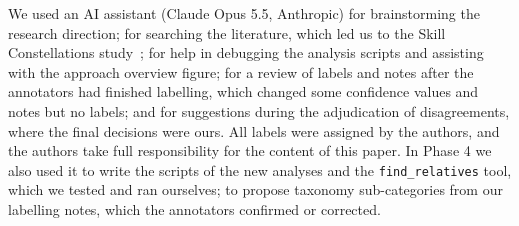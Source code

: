 \documentclass[sigconf,screen]{acmart}
\begin{document}
\begin{acks}
We used an AI assistant (Claude Opus 5.5, Anthropic) for brainstorming the research direction; for searching the literature, which led us to the Skill Constellations study~\cite{seddik2026constellations}; for help in debugging the analysis scripts and assisting with the approach overview figure; for a review of labels and notes after the annotators had finished labelling, which changed some confidence values and notes but no labels; and for suggestions during the adjudication of disagreements, where the final decisions were ours. All labels were assigned by the authors, and the authors take full responsibility for the content of this paper. In Phase 4 we also used it to write the scripts of the new analyses and the \texttt{find\_relatives} tool, which we tested and ran ourselves; to propose taxonomy sub-categories from our labelling notes, which the annotators confirmed or corrected.
\end{acks}



\end{document}
